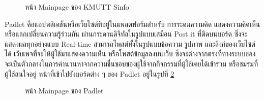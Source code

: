\documentclass[14pt,oneside,openright,a4paper]{cpe-thai-project}
\begin{document}
  \begin{figure}[!h]\centering
    \setlength{\fboxrule}{0.5mm} %
    \setlength{\fboxsep}{0.5cm}
    \caption{หน้า Mainpage ของ KMUTT Sinfo}\label{fig:sinfo}
    \end{figure}

\newpage

Padlet คือแอปพลิเคชันหรือเว็บไซต์ที่อยู่ในแพลตฟอร์มสำหรับ การระดมความคิด แสดงความคิดเห็น หรือแลกเปลี่ยนความรู้ร่วมกัน ผ่านกระดานดิจิทัลในรูปแบบเสมือน Post it ที่ติดบนบอร์ด ซึ่งจะแสดงผลทุกอย่างแบบ Real-time สามารถโพสต์ทั้งในรูปแบบข้อความ รูปภาพ และลิงก์ของเว็บไซต์ได้ เว็บเพจที่จะให้ผู้ใช้มาแสดงความเห็น หรือโพสต์ข้อมูลลงบนเว็บ ซึ่งจะต่างจากตรงที่ทางระบบของจะเป็นตัวกลางในการคำนวนหาจากความชื่นชอบของผู้ใช้จากกิจกรรมที่ผู้ใช้เคยได้เข้าร่วม หรือชมรมที่ผู้ใช้สนใจอยู่ หน้าที่เข้าไปยังบอร์ดต่าง ๆ ของ Padlet อยู่ในรูปที่ \ref{fig:padlet}

  \begin{figure}[!h]\centering
    \setlength{\fboxrule}{0.5mm} %
    \setlength{\fboxsep}{0.5cm}
    \caption{หน้า Mainpage ของ Padlet}\label{fig:padlet}
    \end{figure}
\end{document}

